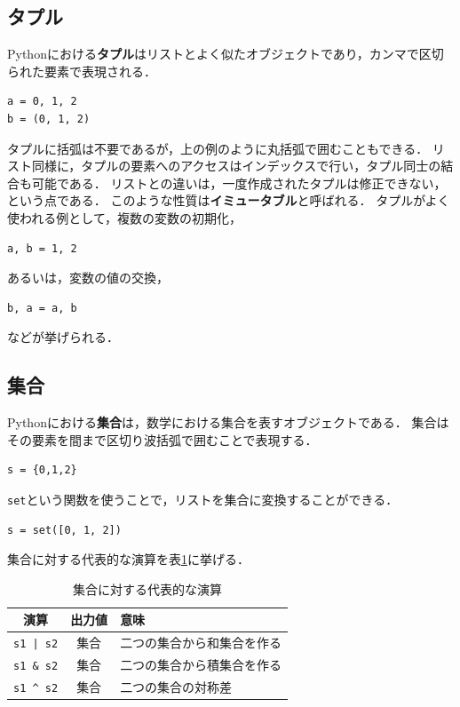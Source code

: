 \documentclass[a4paper,12pt]{jsarticle}
\begin{document}
\subsection{タプル}

Pythonにおける{\bf タプル}はリストとよく似たオブジェクトであり，カンマで区切られた要素で表現される．
\begin{lstlisting}[caption=タプルの例,label=tuple]
a = 0, 1, 2
b = (0, 1, 2)
\end{lstlisting}
タプルに括弧は不要であるが，上の例のように丸括弧で囲むこともできる．
リスト同様に，タプルの要素へのアクセスはインデックスで行い，タプル同士の結合も可能である．
リストとの違いは，一度作成されたタプルは修正できない，という点である．
このような性質は{\bf イミュータブル}と呼ばれる．
タプルがよく使われる例として，複数の変数の初期化，
\begin{lstlisting}[caption=複数の変数の初期化,label=tuple_init]
a, b = 1, 2
\end{lstlisting}
あるいは，変数の値の交換，
\begin{lstlisting}[caption=変数の値の交換,label=tuple_exchange]
b, a = a, b
\end{lstlisting}
などが挙げられる．

\subsection{集合}

Pythonにおける{\bf 集合}は，数学における集合を表すオブジェクトである．
集合はその要素を間まで区切り波括弧で囲むことで表現する．
\begin{lstlisting}[caption=集合の例,label=set]
s = {0,1,2}
\end{lstlisting}
\texttt{set}という関数を使うことで，リストを集合に変換することができる．
\begin{lstlisting}[caption=リストを集合に変換,label=set_list]
s = set([0, 1, 2])
\end{lstlisting}
集合に対する代表的な演算を表\ref{tab:set}に挙げる．

\begin{table}[H]
    \centering
    \caption{集合に対する代表的な演算}
    \begin{tabular}{c|c|l}
        \hline
        演算 & 出力値 & 意味 \\
        \hline\hline
        \texttt{s1 | s2} & 集合 & 二つの集合から和集合を作る \\
        \texttt{s1 \& s2} &集合 & 二つの集合から積集合を作る \\
        \texttt{s1 \^~s2} & 集合 & 二つの集合の対称差 \\
        \hline
    \end{tabular}
    \label{tab:set}
\end{table}
\end{document}
